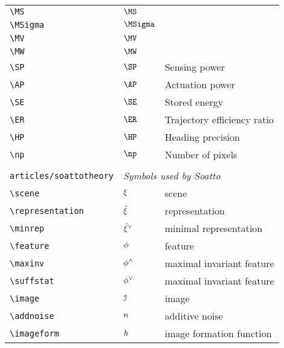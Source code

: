 \begin{longtable}{lll}
 {\color[rgb]{0.5,0.5,0.5}\texttt{\textbackslash MS}} & $\MS$ & \\ 
 {\color[rgb]{0.5,0.5,0.5}\texttt{\textbackslash MSigma}} & $\MSigma$ & \\ 
 {\color[rgb]{0.5,0.5,0.5}\texttt{\textbackslash MV}} & $\MV$ & \\ 
 {\color[rgb]{0.5,0.5,0.5}\texttt{\textbackslash MW}} & $\MW$ & \\ 
 {\color[rgb]{0.5,0.5,0.5}\texttt{\textbackslash SP}} & $\SP$ &  Sensing power\\ 
 {\color[rgb]{0.5,0.5,0.5}\texttt{\textbackslash AP}} & $\AP$ &  Actuation power\\ 
 {\color[rgb]{0.5,0.5,0.5}\texttt{\textbackslash SE}} & $\SE$ &  Stored energy\\ 
 {\color[rgb]{0.5,0.5,0.5}\texttt{\textbackslash ER}} & $\ER$ &  Trajectory efficiency ratio\\ 
 {\color[rgb]{0.5,0.5,0.5}\texttt{\textbackslash HP}} & $\HP$ &  Heading precision\\ 
 {\color[rgb]{0.5,0.5,0.5}\texttt{\textbackslash np}} & $\np$ &  Number of pixels\\ 
  &  & \\ 
 {\color[rgb]{0.5,0.5,0.5}\texttt{articles/soattotheory}} & \multicolumn{2}{l}{\emph{Symbols used by Soatto}}\\ 
 \hline
{\color[rgb]{0.5,0.5,0.5}\texttt{\textbackslash scene}} & $\xi$ &  scene\\ 
 {\color[rgb]{0.5,0.5,0.5}\texttt{\textbackslash representation}} & $\hat{\xi}$ &  representation\\ 
 {\color[rgb]{0.5,0.5,0.5}\texttt{\textbackslash minrep}} & ${\hat{\xi}}^{\vee}$ &  minimal representation\\ 
 {\color[rgb]{0.5,0.5,0.5}\texttt{\textbackslash feature}} & $\phi$ &  feature\\ 
 {\color[rgb]{0.5,0.5,0.5}\texttt{\textbackslash maxinv}} & $\phi^{\wedge}$ &  maximal invariant feature\\ 
 {\color[rgb]{0.5,0.5,0.5}\texttt{\textbackslash suffstat}} & $\phi^{\vee}$ &  maximal invariant feature\\ 
 {\color[rgb]{0.5,0.5,0.5}\texttt{\textbackslash image}} & $\mathcal{I}$ &  image\\ 
 {\color[rgb]{0.5,0.5,0.5}\texttt{\textbackslash addnoise}} & $n$ &  additive noise\\ 
 {\color[rgb]{0.5,0.5,0.5}\texttt{\textbackslash imageform}} & $h$ &  image formation function\\ 

\end{longtable}
